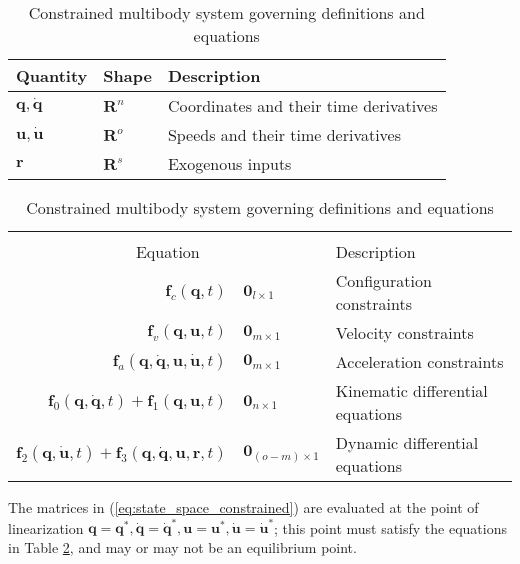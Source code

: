 \documentclass[smallcondensed]{svjour3}                     %
\begin{document}
\begin{table}[htbp]
  \centering
  \caption{Constrained multibody system governing definitions and equations}
  \label{table:assumptions}
  \begin{tabular}[c]{l l l}
    Quantity & Shape & Description\\
    \hline
    $\bm{q},\bm{\dot{q}}$ & $\mathbf{R}^n$ & Coordinates and their time
    derivatives\\
    $\bm{u}, \bm{\dot{u}}$ & $\mathbf{R}^o$ & Speeds and their time derivatives\\
    $\bm{r}$ & $\mathbf{R}^s$ & Exogenous inputs \\
  \end{tabular}
  \begin{tabular}[c]{r @{ $=$ } l l}
    \multicolumn{3}{c}{ } \\
    \multicolumn{2}{c}{Equation} & Description \\
    \hline
    $\bm{f}_{c}(\bm{q}, t)$ & $\bm{0}_{l \times 1}$ & Configuration constraints \\
    $\bm{f}_{v}(\bm{q}, \bm{u}, t)$ & $\bm{0}_{m \times 1}$ & Velocity constraints \\
    $\bm{f}_{a}(\bm{q}, \bm{\dot{q}}, \bm{u}, \bm{\dot{u}}, t)$ & $\bm{0}_{m
    \times 1}$ & Acceleration constraints \\
    $\bm{f}_{0}(\bm{q}, \bm{\dot{q}}, t) + \bm{f}_{1}(\bm{q}, \bm{u}, t)$ &
    $\bm{0}_{n \times 1}$ & Kinematic differential equations \\
    $\bm{f}_{2}(\bm{q}, \bm{\dot{u}}, t) + \bm{f}_{3}(\bm{q}, \bm{\dot{q}},
    \bm{u}, \bm{r}, t)$ & $\bm{0}_{(o - m) \times 1}$ & Dynamic differential equations
  \end{tabular}
\end{table}

The matrices in (\ref{eq:state_space_constrained}) are evaluated at
the point of linearization $\bm{q}=\bm{q}^*, \bm{\dot{q}}=\bm{\dot{q}}^*,
\bm{u}=\bm{u}^*, \bm{\dot{u}}=\bm{\dot{u}}^*$; this point must satisfy the
equations in Table \ref{table:assumptions}, and may or may not be an
equilibrium point.
\end{document}
